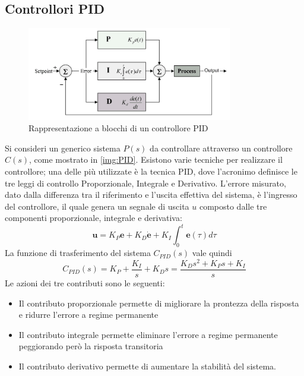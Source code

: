 \subsection{Controllori PID}
    \begin{figure}[h]
      \centering
      \includegraphics[width=0.8\textwidth]{img/PID.png}
      \caption{Rappresentazione a blocchi di un controllore PID}
      \label{img:PID}
    \end{figure}
    \noindent
  Si consideri un generico sistema $P(s)$ da controllare attraverso un controllore $C(s)$, come mostrato in \autoref{img:PID}. Esistono varie tecniche per realizzare il controllore; una delle più utilizzate è la tecnica PID, dove l'acronimo definisce le tre leggi di controllo Proporzionale, Integrale e Derivativo. L'errore misurato, dato dalla differenza tra il riferimento e l'uscita effettiva 
    del sistema, è l'ingresso del controllore, il quale genera un segnale di uscita $u$ composto dalle tre componenti 
    proporzionale, integrale e derivativa:
    \begin{displaymath}
      \boldsymbol{u} = K_P  \boldsymbol{e}  + K_D  \dot{ \boldsymbol{e}} + K_I \int_{0}^t  \boldsymbol{e}(\tau) d\tau 
    \end{displaymath}
  La funzione di trasferimento del sistema $C_{PID}(s)$ vale quindi 
  \begin{displaymath}
    C_{PID}(s)=K_P + \frac{K_I}{s}+ K_Ds = \frac{K_Ds^2 + K_Ps + K_I}{s}
  \end{displaymath}
  Le azioni dei tre contributi sono le seguenti:
  \begin{itemize}
    \item Il contributo proporzionale permette di migliorare la prontezza della risposta e ridurre l'errore a regime permanente
    \item Il contributo integrale permette eliminare l'errore a regime permanente peggiorando però la risposta transitoria
    \item Il contributo derivativo permette di aumentare la stabilità del sistema.
  \end{itemize}

